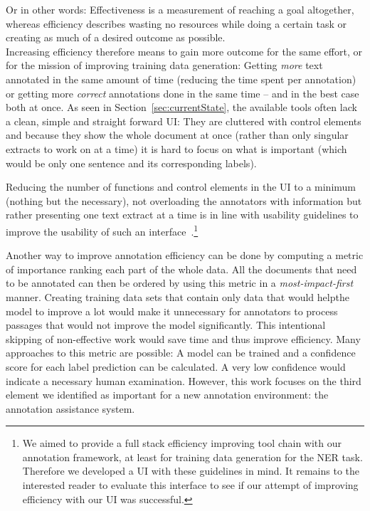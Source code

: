   Or in other words: Effectiveness is a measurement of reaching a goal altogether, whereas efficiency describes wasting no resources while doing a certain task or creating as much of a desired outcome as possible. \\
  Increasing efficiency therefore means to gain more outcome for the same effort, or for the mission of improving training data generation: Getting \textit{more} text annotated in the same amount of time (reducing the time spent per annotation) or getting more \textit{correct} annotations done in the same time -- and in the best case both at once. As seen in Section~\ref{sec:currentState}, the available tools often lack a clean, simple and straight forward \ac{UI}: They are cluttered with control elements and because they show the whole document at once (rather than only singular extracts to work on at a time) it is hard to focus on what is important (which would be only one sentence and its corresponding labels).

  \pagebreak

  Reducing the number of functions and control elements in the \ac{UI} to a minimum (nothing but the necessary), not overloading the annotators with information but rather presenting one text extract at a time is in line with usability guidelines to improve the usability of such an interface~\cite{galitz2007essential}.\footnote{We aimed to provide a full stack efficiency improving tool chain with our annotation framework, at least for training data generation for the \ac{NER} task. Therefore we developed a \ac{UI} with these guidelines in mind. It remains to the interested reader to evaluate this interface to see if our attempt of improving efficiency with our \ac{UI} was successful.}

  \label{sec:efficiencyAL}
  Another way to improve annotation efficiency can be done by computing a metric of importance ranking each part of the whole data. All the documents that need to be annotated can then be ordered by using this metric in a \textit{most-impact-first} manner. Creating training data sets that contain only data that would \lqq help\rqq the model to improve a lot would make it unnecessary for annotators to process passages that would not improve the model significantly. This intentional skipping of non-effective work would save time and thus improve efficiency. Many approaches to this metric are possible: A model can be trained and a confidence score for each label prediction can be calculated. A very low confidence would indicate a necessary human examination. However, this work focuses on the third element we identified as important for a new annotation environment: the annotation assistance system.

